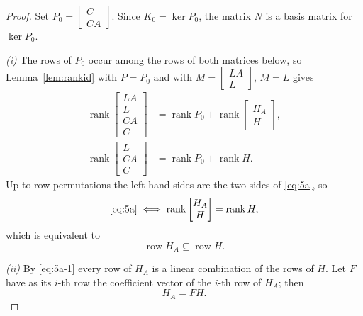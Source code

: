 \documentclass[journal]{IEEEtran}
\theoremstyle{plainn}
\theoremstyle{remark}
\begin{document}
\begin{proof}
Set $P_0=\begin{bmatrix}C\\CA\end{bmatrix}$. Since $K_0=\ker P_0$, the matrix $N$ is a basis matrix for $\ker P_0$.

\emph{(i)} The rows of $P_0$ occur among the rows of both matrices below, so Lemma~\ref{lem:rankid} with $P=P_0$ and with $M=\begin{bmatrix}LA\\L\end{bmatrix}$, $M=L$ gives
\begin{equation*}
\begin{aligned}
\operatorname{rank}\begin{bmatrix}LA\\ L\\ CA\\ C\end{bmatrix}
&=\operatorname{rank}P_0+\operatorname{rank}\begin{bmatrix}H_A\\ H\end{bmatrix},\\
\operatorname{rank}\begin{bmatrix}L\\ CA\\ C\end{bmatrix}
&=\operatorname{rank}P_0+\operatorname{rank}H .
\end{aligned}
\end{equation*}
Up to row permutations the left-hand sides are the two sides of \eqref{eq:5a}, so
\begin{equation*}
\eqref{eq:5a}
\iff
\operatorname{rank}\begin{bmatrix}H_A\\ H\end{bmatrix}=\operatorname{rank}H ,
\end{equation*}
which is equivalent to
\begin{equation}\label{eq:5a-1}
\operatorname{row}H_A\subseteq\operatorname{row}H .
\end{equation}

\emph{(ii)} By \eqref{eq:5a-1} every row of $H_A$ is a linear combination of the rows of $H$. Let $F$ have as its $i$-th row the coefficient vector of the $i$-th row of $H_A$; then
\begin{equation}\label{eq:5a-2}
H_A=FH .
\end{equation}


\end{proof}
\end{document}
